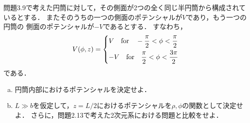 \begin{bx1}
  問題3.9で考えた円筒に対して，その側面が2つの全く同じ半円筒から構成されているとする．
  またそのうちの一つの側面のポテンシャルが$V$であり，もう一つの円筒の
  側面のポテンシャルが$-V$であるとする．
  すなわち，
  \begin{gather}%
    V(\phi,z) = 
    \begin{dcases}%
      V \qqtext{for} -\frac{\pi}{2} < \phi < \frac{\pi}{2}\\
      -V \qqtext{for} \frac{\pi}{2} < \phi < \frac{3\pi}{2}
    \end{dcases}%
  \end{gather}%
  である．
  \begin{enumerate}[(a)]%
    \item
      円筒内部におけるポテンシャルを決定せよ．
    \item 
      $L \gg b$を仮定して，$z = L/2$におけるポテンシャルを$\rho, \phi$の関数として決定せよ．
      さらに，問題2.13で考えた2次元系における問題と比較をせよ．
  \end{enumerate}%
\end{bx1}


\clearpage
